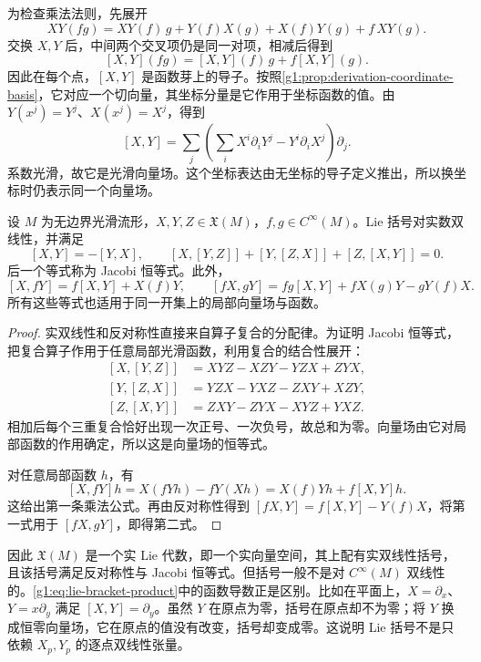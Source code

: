 为检查乘法法则，先展开
\[
	XY(fg)=XY(f)\,g+Y(f)X(g)+X(f)Y(g)+f\,XY(g).
\]
交换 \(X,Y\) 后，中间两个交叉项仍是同一对项，相减后得到
\[
	[X,Y](fg)=[X,Y](f)\,g+f[X,Y](g).
\]
因此在每个点，\([X,Y]\) 是函数芽上的导子。按照\cref{g1:prop:derivation-coordinate-basis}，它对应一个切向量，其坐标分量是它作用于坐标函数的值。由 \(Y(x^j)=Y^j\)、\(X(x^j)=X^j\)，得到
\begin{equation}
	\label{g1:eq:lie-bracket-coordinates}
	[X,Y]=\sum_j\left(\sum_iX^i\partial_iY^j-Y^i\partial_iX^j\right)\partial_j.
\end{equation}
系数光滑，故它是光滑向量场。这个坐标表达由无坐标的导子定义推出，所以换坐标时仍表示同一个向量场。

\begin{proposition}
	\label{g1:prop:lie-bracket-properties}
	设 \(M\) 为无边界光滑流形，\(X,Y,Z\in\mathfrak X(M)\)，\(f,g\in C^\infty(M)\)。Lie 括号对实数双线性，并满足
	\[
		[X,Y]=-[Y,X],\qquad
		[X,[Y,Z]]+[Y,[Z,X]]+[Z,[X,Y]]=0.
	\]
	后一个等式称为 Jacobi 恒等式。此外，
	\begin{equation}
		\label{g1:eq:lie-bracket-product}
		[X,fY]=f[X,Y]+X(f)Y,\qquad
		[fX,gY]=fg[X,Y]+fX(g)Y-gY(f)X.
	\end{equation}
	所有这些等式也适用于同一开集上的局部向量场与函数。
\end{proposition}
\begin{proof}
	实双线性和反对称性直接来自算子复合的分配律。为证明 Jacobi 恒等式，把复合算子作用于任意局部光滑函数，利用复合的结合性展开：
	\[
		\begin{aligned}
			[X,[Y,Z]]&=XYZ-XZY-YZX+ZYX,\\
			[Y,[Z,X]]&=YZX-YXZ-ZXY+XZY,\\
			[Z,[X,Y]]&=ZXY-ZYX-XYZ+YXZ.
		\end{aligned}
	\]
	相加后每个三重复合恰好出现一次正号、一次负号，故总和为零。向量场由它对局部函数的作用确定，所以这是向量场的恒等式。

	对任意局部函数 \(h\)，有
	\[
		[X,fY]h=X(fYh)-fY(Xh)
		=X(f)Yh+f[X,Y]h.
	\]
	这给出第一条乘法公式。再由反对称性得到 \([fX,Y]=f[X,Y]-Y(f)X\)，将第一式用于 \([fX,gY]\)，即得第二式。
\end{proof}

因此 \(\mathfrak X(M)\) 是一个实 Lie 代数，即一个实向量空间，其上配有实双线性括号，且该括号满足反对称性与 Jacobi 恒等式。但括号一般不是对 \(C^\infty(M)\) 双线性的。\eqref{g1:eq:lie-bracket-product}中的函数导数正是区别。比如在平面上，\(X=\partial_x\)、\(Y=x\partial_y\) 满足 \([X,Y]=\partial_y\)。虽然 \(Y\) 在原点为零，括号在原点却不为零；将 \(Y\) 换成恒零向量场，它在原点的值没有改变，括号却变成零。这说明 Lie 括号不是只依赖 \(X_p,Y_p\) 的逐点双线性张量。

